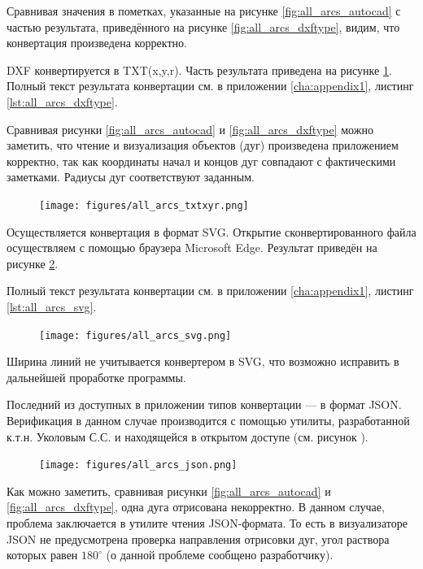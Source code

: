 Сравнивая значения в пометках, указанные на рисунке \ref{fig:all_arcs_autocad} с частью результата, приведённого на рисунке \ref{fig:all_arcs_dxftype}, видим, что конвертация произведена корректно.

DXF конвертируется в TXT(x,y,r). Часть результата приведена на рисунке \ref{fig:all_arcs_txtxyr}. Полный текст результата конвертации см. в приложении \ref{cha:appendix1}, листинг \ref{lst:all_arcs_dxftype}.

Сравнивая рисунки \ref{fig:all_arcs_autocad} и \ref{fig:all_arcs_dxftype} можно заметить, что чтение и визуализация объектов (дуг) произведена приложением корректно, так как координаты начал и концов дуг совпадают с фактическими заметками. Радиусы дуг соответствуют заданным.

\begin{figure}[H]
	\centering
	\texttt{[image: figures/all\_arcs\_txtxyr.png]}
	\label{fig:all_arcs_txtxyr}
\end{figure}

Осуществляется конвертация в формат SVG. Открытие сконвертированного файла осуществляем с помощью браузера Microsoft Edge. Результат приведён на рисунке \ref{fig:all_arcs_svg}.

Полный текст результата конвертации см. в приложении \ref{cha:appendix1}, листинг \ref{lst:all_arcs_svg}.

\begin{figure}[H]
	\centering
	\texttt{[image: figures/all\_arcs\_svg.png]}
	\label{fig:all_arcs_svg}
\end{figure}

Ширина линий не учитывается конвертером в SVG, что возможно исправить в дальнейшей проработке программы.

Последний из доступных в приложении типов конвертации --- в формат JSON. Верификация в данном случае производится с помощью утилиты, разработанной к.т.н. Уколовым С.С. \cite{ukoloff} и находящейся в открытом доступе (см. рисунок ).

\begin{figure}[H]
	\centering
	\texttt{[image: figures/all\_arcs\_json.png]}
	\label{fig:all_arcs_json}
\end{figure}

Как можно заметить, сравнивая рисунки \ref{fig:all_arcs_autocad} и \ref{fig:all_arcs_dxftype}, одна дуга отрисована некорректно. В данном случае, проблема заключается в утилите чтения JSON-формата. То есть в визуализаторе JSON не предусмотрена проверка направления отрисовки дуг, угол раствора которых равен $180^\circ$ (о данной проблеме сообщено разработчику).

